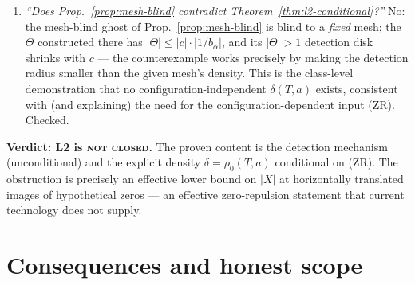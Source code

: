\documentclass[11pt]{article}
\theoremstyle{definition}
\theoremstyle{remark}
\begin{document}
\begin{enumerate}
{$|R_a|>1$ near the pole and the mesh?''} The lattice geometry argument is
elementary and complete given $\rho_0>0$; the level set $A$ is finite so the
certificate family is finite; $\mathcal{B}(T)$ is effective. We find no
second gap. But we \emph{cannot} exclude that (ZR) itself is false --- e.g.\
if hypothetical zero configurations with long horizontal alignment chains
were consistent with all known constraints, no finite $A$ with uniform
$\eta$ would exist. L2 therefore remains \textsc{open} in both directions:
we neither prove (ZR) nor prove it necessary.
\item \emph{``Does Prop.~\ref{prop:mesh-blind} contradict
Theorem~\ref{thm:l2-conditional}?''} No: the mesh-blind ghost of
Prop.~\ref{prop:mesh-blind} is blind to a \emph{fixed} mesh; the
$\Theta$ constructed there has $|\Theta|\le|c|\cdot|1/b_\alpha|$, and its
$|\Theta|>1$ detection disk shrinks with $c$ --- the counterexample works
precisely by making the detection radius smaller than the given mesh's
density. This is the class-level demonstration that no
configuration-independent $\delta(T,a)$ exists, consistent with (and
explaining) the need for the configuration-dependent input (ZR). Checked.
\end{enumerate}

\textbf{Verdict: L2 is \textsc{not closed}.} The proven content is the
detection mechanism (unconditional) and the explicit density
$\delta=\rho_0(T,a)$ conditional on (ZR). The obstruction is precisely an
effective lower bound on $|X|$ at horizontally translated images of
hypothetical zeros --- an effective zero-repulsion statement that current
technology does not supply.

\section{Consequences and honest scope}\label{sec:scope}
\end{document}
